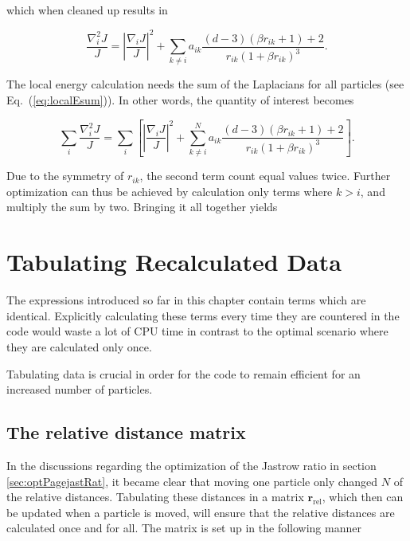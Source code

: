 which when cleaned up results in

\begin{equation}
 \frac{\nabla^2_i J}{J} = \left| \frac{\nabla_i J}{J}\right|^2 + \sum_{k \ne i} a_{ik}\frac{(d-3)(\beta r_{ik} + 1) + 2}{r_{ik}(1 + \beta r_{ik})^3}.
\end{equation}

The local energy calculation needs the sum of the Laplacians for all particles (see Eq.~(\ref{eq:localEsum})). In other words, the quantity of interest becomes

\begin{equation}
 \sum_i \frac{\nabla^2_i J}{J} = \sum_i \left[\left|\frac{\nabla_i J}{J}\right|^2 + \sum_{k \ne i}^N a_{ik}\frac{(d-3)(\beta r_{ik} + 1) + 2}{r_{ik}(1 + \beta r_{ik})^3}\right].
\end{equation}

Due to the symmetry of $r_{ik}$, the second term count equal values twice. Further optimization can thus be achieved by calculation only terms where $k>i$, and multiply the sum by two. Bringing it all together yields



\section{Tabulating Recalculated Data}

The expressions introduced so far in this chapter contain terms which are identical. Explicitly calculating these terms every time they are countered in the code would waste a lot of CPU time in contrast to the optimal scenario where they are calculated only once.

Tabulating data is crucial in order for the code to remain efficient for an increased number of particles. 

\subsection{The relative distance matrix}
\label{sec:relDist}

In the discussions regarding the optimization of the Jastrow ratio in section \ref{sec:optPagejastRat}, it became clear that moving one particle only changed $N$ of the relative distances. Tabulating these distances in a matrix $\mathbf{r}_\mathrm{rel}$, which then can be updated when a particle is moved, will ensure that the relative distances are calculated once and for all. The matrix is set up in the following manner

